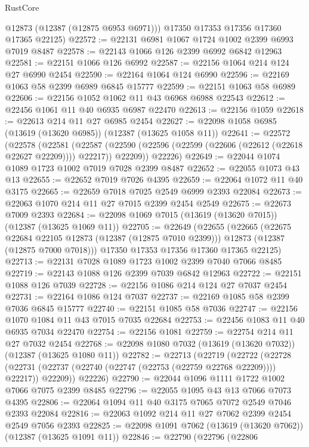 \begin{lexlean}{RustCore}
\begin{coremodule}
        @12873
        (@12387 (@12875 @6953 @6971)))
      @17350
      @17353
      @17356
      @17360
      @17365
      @22125)
@22572 := @22131 @6981 @1067 @1724 @1002 @2399 @6993 @7019 @8487
@22578 := @22143 @1066 @126 @2399 @6992 @6842 @12963
@22581 := @22151 @1066 @126 @6992
@22587 := @22156 @1064 @214 @124 @27 @6990 @2454
@22590 := @22164 @1064 @124 @6990
@22596 := @22169 @1063 @58 @2399 @6989 @6845 @15777
@22599 := @22151 @1063 @58 @6989
@22606 := @22156 @1052 @1062 @11 @43 @6968 @6988 @22543
@22612 := @22456 @1061 @11 @40 @6935 @6987 @22470
@22613 := @22156 @1059
@22618 := @22613 @214 @11 @27 @6985 @2454
@22627 := @22098 @1058 @6985 (@13619 (@13620 @6985)) (@12387 (@13625 @1058 @11))
@22641 := @22572
    (@22578
      (@22581
        (@22587 (@22590 (@22596 (@22599 (@22606 (@22612 (@22618 @22627 @22209)))) @22217)) @22209))
      @22226)
@22649 := @22044 @1074 @1089 @1723 @1002 @7019 @7028 @2399 @8487
@22652 := @22055 @1073 @43 @13
@22655 := @22652 @7019 @7026 @4395
@22659 := @22064 @1072 @11 @40 @3175
@22665 := @22659 @7018 @7025 @2549 @6999 @2393 @22084
@22673 := @22063 @1070 @214 @11 @27 @7015 @2399 @2454 @2549
@22675 := @22673 @7009 @2393
@22684 := @22098 @1069 @7015 (@13619 (@13620 @7015)) (@12387 (@13625 @1069 @11))
@22705 := @22649
    (@22655
      (@22665
        (@22675 @22684 @22105 @12873 (@12387 (@12875 @7010 @2399)))
        @12873
        (@12387 (@12875 @7000 @7018)))
      @17350
      @17353
      @17356
      @17360
      @17365
      @22125)
@22713 := @22131 @7028 @1089 @1723 @1002 @2399 @7040 @7066 @8485
@22719 := @22143 @1088 @126 @2399 @7039 @6842 @12963
@22722 := @22151 @1088 @126 @7039
@22728 := @22156 @1086 @214 @124 @27 @7037 @2454
@22731 := @22164 @1086 @124 @7037
@22737 := @22169 @1085 @58 @2399 @7036 @6845 @15777
@22740 := @22151 @1085 @58 @7036
@22747 := @22156 @1070 @1084 @11 @43 @7015 @7035 @22684
@22753 := @22456 @1083 @11 @40 @6935 @7034 @22470
@22754 := @22156 @1081
@22759 := @22754 @214 @11 @27 @7032 @2454
@22768 := @22098 @1080 @7032 (@13619 (@13620 @7032)) (@12387 (@13625 @1080 @11))
@22782 := @22713
    (@22719
      (@22722
        (@22728 (@22731 (@22737 (@22740 (@22747 (@22753 (@22759 @22768 @22209)))) @22217)) @22209))
      @22226)
@22790 := @22044 @1096 @1111 @1722 @1002 @7066 @7075 @2399 @8485
@22796 := @22055 @1095 @43 @13 @7066 @7073 @4395
@22806 := @22064 @1094 @11 @40 @3175 @7065 @7072 @2549 @7046 @2393 @22084
@22816 := @22063 @1092 @214 @11 @27 @7062 @2399 @2454 @2549 @7056 @2393
@22825 := @22098 @1091 @7062 (@13619 (@13620 @7062)) (@12387 (@13625 @1091 @11))
@22846 := @22790
    (@22796
      (@22806

\end{coremodule}
\end{lexlean}
